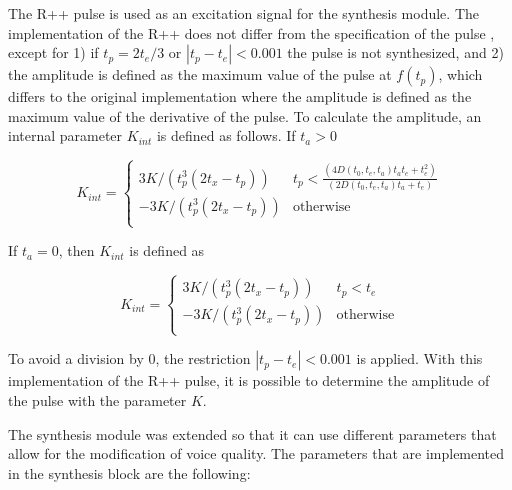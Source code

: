 \documentclass[final,5p,times,twocolumn]{elsarticle}
\begin{document}
The R++ pulse is used as an excitation signal for the synthesis module. The implementation of the R++ does not differ from the specification of the pulse \cite{Veldhuis_1998}\cite{doval2006spectrum}, except for 1) if $t_p = 2t_e/3$ or $|t_p - t_e| < 0.001$ the pulse is not synthesized, and 2) the amplitude is defined as the maximum value of the pulse at $f(t_p)$, which differs to the original implementation where the amplitude is defined as the maximum value of the derivative of the pulse. To calculate the amplitude, an internal parameter $K_{int}$ is defined as follows. If $t_a > 0$

\begin{equation}
    K_{int} =
        \begin{cases}
            3K/(t_{p}^{3}(2 t_x - t_p)) & t_p < \frac{(4D(t_0,t_e,t_a)t_a t_e + t_{e}^{2})}{(2D(t_0,t_e,t_a)t_a+t_e)} \\
            -3K/(t_{p}^{3}(2 t_x - t_p)) & \text{otherwise} \\
        \end{cases}
\end{equation}

If $t_a = 0$, then $K_{int}$ is defined as

\begin{equation}
    K_{int} =
        \begin{cases}
           3K/(t_{p}^{3}(2t_x - t_p)) & t_p < t_e \\
           -3K/(t_{p}^{3}(2t_x - t_p)) & \text{otherwise} \\
        \end{cases}
\end{equation}

To avoid a division by $0$, the restriction $|t_p - t_e| < 0.001$ is applied. With this implementation of the R++ pulse, it is possible to determine the amplitude of the pulse with the parameter $K$.

The synthesis module was extended so that it can use different parameters that allow for the modification of voice quality. The parameters that are implemented in the synthesis block are the following:
\end{document}
